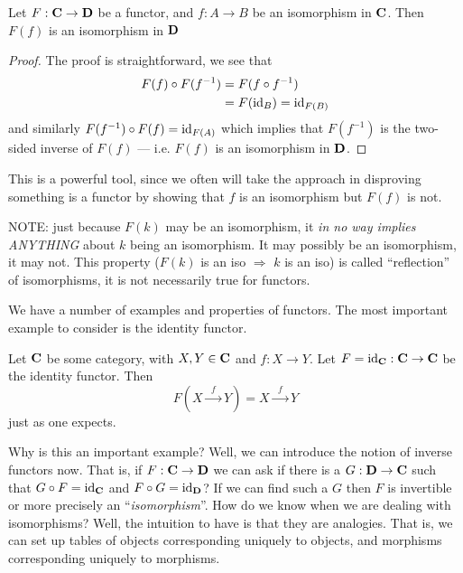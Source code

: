 \begin{thm}
Let $F:\mathbf{C}\to\mathbf{D}$ be a functor, and $f:A\to{}B$ be an
isomorphism in $\mathbf{C}$. Then $F(f)$ is an isomorphism in $\mathbf{D}$
\end{thm}
\begin{proof}
The proof is straightforward, we see that
\begin{subequations}
\begin{align}
F(f)\circ{}F(f^{-1}) &= F(f\circ{}f^{-1})\\
&= F(\operatorname{id}_{B}) = \operatorname{id}_{F(B)}
\end{align}
\end{subequations}
and similarly $F(f^{-1})\circ{}F(f)=\operatorname{id}_{F(A)}$ which implies that
$F(f^{-1})$ is the two-sided inverse of $F(f)$ --- i.e. $F(f)$ is
an isomorphism in $\mathbf{D}$.
\end{proof}

This is a powerful tool, since we often will take the approach in
disproving something is a functor by showing that $f$ is an
isomorphism but $F(f)$ is not.

NOTE: just because $F(k)$ may be an isomorphism, it \emph{in no way implies ANYTHING} about $k$ being an isomorphism. It may
possibly be an isomorphism, it may not. This property ($F(k)$ is
an iso $\Rightarrow$ $k$ is an iso) is called ``reflection'' of
isomorphisms, it is not necessarily true for functors. 

We have a number of examples and properties of functors. The most
important example to consider is the identity functor.
\begin{ex}\label{ex:identityFunctor}
Let $\mathbf{C}$ be some category, with $X,Y\in\mathbf{C}$ and
$f:X\to{}Y$. Let $F=\operatorname{id}_{\mathbf{C}}:\mathbf{C}\to\mathbf{C}$ be the identity
functor. Then
\begin{equation}
F\left(X\xrightarrow{\;\;f\;\;}Y\right) = X\xrightarrow{\;\;f\;\;}Y
\end{equation}
just as one expects.
\end{ex}
Why is this an important example? Well, we can introduce the
notion of inverse functors now. That is, if $F:\mathbf{C}\to\mathbf{D}$
we can ask if there is a $G:\mathbf{D}\to\mathbf{C}$ such that
$G\circ{}F=\operatorname{id}_{\mathbf{C}}$ and $F\circ{}G=\operatorname{id}_{\mathbf{D}}$? If we can
find such a $G$ then $F$ is invertible or more precisely an
``\emph{isomorphism}''. How do we know when we are dealing with
isomorphisms? Well, the intuition to have is that they are
analogies. That is, we can set up tables of objects corresponding
uniquely to objects, and morphisms corresponding uniquely to
morphisms. 

